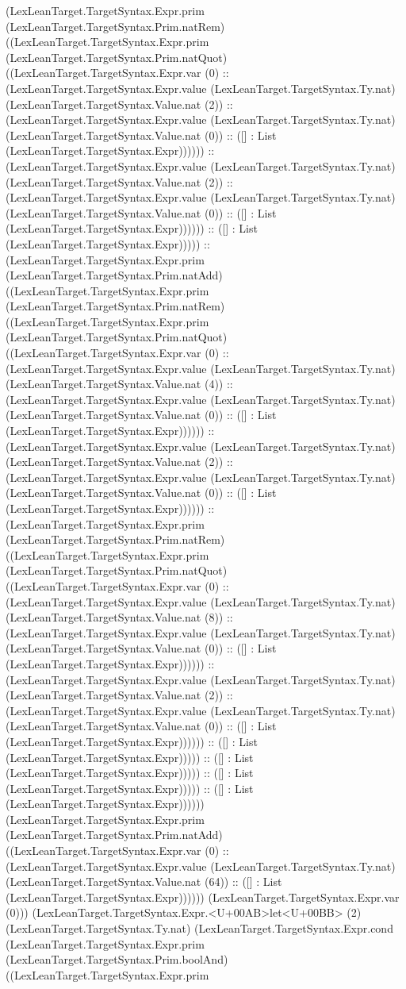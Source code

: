 \documentclass[11pt]{article}
\begin{document}
(LexLeanTarget.TargetSyntax.Expr.prim (LexLeanTarget.TargetSyntax.Prim.natRem) ((LexLeanTarget.TargetSyntax.Expr.prim (LexLeanTarget.TargetSyntax.Prim.natQuot) ((LexLeanTarget.TargetSyntax.Expr.var (0) :: (LexLeanTarget.TargetSyntax.Expr.value (LexLeanTarget.TargetSyntax.Ty.nat) (LexLeanTarget.TargetSyntax.Value.nat (2)) :: (LexLeanTarget.TargetSyntax.Expr.value (LexLeanTarget.TargetSyntax.Ty.nat) (LexLeanTarget.TargetSyntax.Value.nat (0)) :: ([] : List (LexLeanTarget.TargetSyntax.Expr)))))) :: (LexLeanTarget.TargetSyntax.Expr.value (LexLeanTarget.TargetSyntax.Ty.nat) (LexLeanTarget.TargetSyntax.Value.nat (2)) :: (LexLeanTarget.TargetSyntax.Expr.value (LexLeanTarget.TargetSyntax.Ty.nat) (LexLeanTarget.TargetSyntax.Value.nat (0)) :: ([] : List (LexLeanTarget.TargetSyntax.Expr)))))) :: ([] : List (LexLeanTarget.TargetSyntax.Expr))))) :: (LexLeanTarget.TargetSyntax.Expr.prim (LexLeanTarget.TargetSyntax.Prim.natAdd) ((LexLeanTarget.TargetSyntax.Expr.prim (LexLeanTarget.TargetSyntax.Prim.natRem) ((LexLeanTarget.TargetSyntax.Expr.prim (LexLeanTarget.TargetSyntax.Prim.natQuot) ((LexLeanTarget.TargetSyntax.Expr.var (0) :: (LexLeanTarget.TargetSyntax.Expr.value (LexLeanTarget.TargetSyntax.Ty.nat) (LexLeanTarget.TargetSyntax.Value.nat (4)) :: (LexLeanTarget.TargetSyntax.Expr.value (LexLeanTarget.TargetSyntax.Ty.nat) (LexLeanTarget.TargetSyntax.Value.nat (0)) :: ([] : List (LexLeanTarget.TargetSyntax.Expr)))))) :: (LexLeanTarget.TargetSyntax.Expr.value (LexLeanTarget.TargetSyntax.Ty.nat) (LexLeanTarget.TargetSyntax.Value.nat (2)) :: (LexLeanTarget.TargetSyntax.Expr.value (LexLeanTarget.TargetSyntax.Ty.nat) (LexLeanTarget.TargetSyntax.Value.nat (0)) :: ([] : List (LexLeanTarget.TargetSyntax.Expr)))))) :: (LexLeanTarget.TargetSyntax.Expr.prim (LexLeanTarget.TargetSyntax.Prim.natRem) ((LexLeanTarget.TargetSyntax.Expr.prim (LexLeanTarget.TargetSyntax.Prim.natQuot) ((LexLeanTarget.TargetSyntax.Expr.var (0) :: (LexLeanTarget.TargetSyntax.Expr.value (LexLeanTarget.TargetSyntax.Ty.nat) (LexLeanTarget.TargetSyntax.Value.nat (8)) :: (LexLeanTarget.TargetSyntax.Expr.value (LexLeanTarget.TargetSyntax.Ty.nat) (LexLeanTarget.TargetSyntax.Value.nat (0)) :: ([] : List (LexLeanTarget.TargetSyntax.Expr)))))) :: (LexLeanTarget.TargetSyntax.Expr.value (LexLeanTarget.TargetSyntax.Ty.nat) (LexLeanTarget.TargetSyntax.Value.nat (2)) :: (LexLeanTarget.TargetSyntax.Expr.value (LexLeanTarget.TargetSyntax.Ty.nat) (LexLeanTarget.TargetSyntax.Value.nat (0)) :: ([] : List (LexLeanTarget.TargetSyntax.Expr)))))) :: ([] : List (LexLeanTarget.TargetSyntax.Expr))))) :: ([] : List (LexLeanTarget.TargetSyntax.Expr))))) :: ([] : List (LexLeanTarget.TargetSyntax.Expr))))) :: ([] : List (LexLeanTarget.TargetSyntax.Expr)))))) (LexLeanTarget.TargetSyntax.Expr.prim (LexLeanTarget.TargetSyntax.Prim.natAdd) ((LexLeanTarget.TargetSyntax.Expr.var (0) :: (LexLeanTarget.TargetSyntax.Expr.value (LexLeanTarget.TargetSyntax.Ty.nat) (LexLeanTarget.TargetSyntax.Value.nat (64)) :: ([] : List (LexLeanTarget.TargetSyntax.Expr)))))) (LexLeanTarget.TargetSyntax.Expr.var (0))) (LexLeanTarget.TargetSyntax.Expr.<U+00AB>let<U+00BB> (2) (LexLeanTarget.TargetSyntax.Ty.nat) (LexLeanTarget.TargetSyntax.Expr.cond (LexLeanTarget.TargetSyntax.Expr.prim (LexLeanTarget.TargetSyntax.Prim.boolAnd) ((LexLeanTarget.TargetSyntax.Expr.prim 
\end{document}
